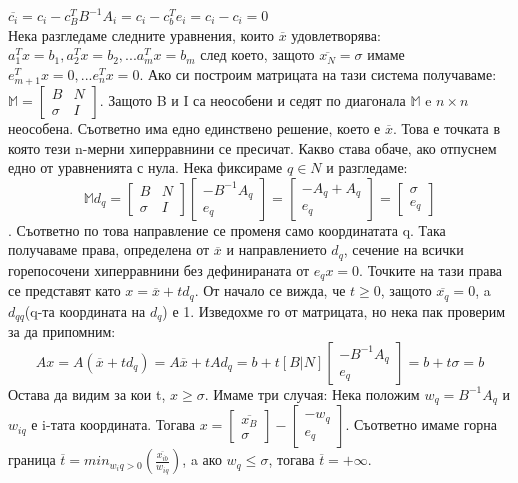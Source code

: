 \documentclass[12pt, a4paper]{article}
\def\D{\mathbb}
\begin{document}
$\overline{c_i} = c_i-c_B^TB^{-1}A_i=c_i-c_b^Te_i=c_i-c_i=0$\\
Нека разгледаме следните уравнения, които $\overline{x}$ удовлетворява: $a_1^Tx=b_1, a_2^Tx=b_2,...a_m^Tx=b_m$ след което, защото $\overline{x_N}=\sigma$ имаме $e_{m+1}^Tx=0,... e_n^Tx=0$. Ако си построим матрицата на тази система получаваме: $\D{M}=\left[\begin{array}{c|c}B & N \\ \hline \sigma & I \end{array}\right]$. Защото B и I са неособени и седят по диагонала $\D{M}$ e $n\times n$ неособена. Съответно има едно единствено решение, което е $\overline{x}$. Това е точката в която тези n-мерни хиперравнини се пресичат. Какво става обаче, ако отпуснем едно от уравненията с нула. Нека фиксираме $q\in N$ и разгледаме: 
\[\D{M}d_q = \left[\begin{array}{c|c}B & N \\ \hline \sigma & I \end{array}\right]\begin{bmatrix}-B^{-1}A_q\\ e_q\end{bmatrix}=\begin{bmatrix}-A_q+A_q\\ e_q\end{bmatrix}=\begin{bmatrix}\sigma\\ e_q\end{bmatrix}\].
Съответно по това направление се променя само координатата q. Така получаваме права, определена от $\overline{x}$ и направлението $d_q$, сечение на всички горепосочени хиперравнини без дефинираната от $e_qx=0$. Точките на тази права се представят като $x = \overline{x} + td_q$. От начало се вижда, че $t \geq 0 $, защото $\overline{x_q}=0$, a $d_{qq}$(q-та координата на $d_q$) е 1. Изведохме го от матрицата, но нека пак проверим за да припомним:
\[Ax = A(\overline{x}+td_q) = A\overline{x} + tAd_q = b+t[B|N]\begin{bmatrix}-B^{-1}A_q\\ e_q\end{bmatrix} = b+t\sigma=b\]
Остава да видим за кои t, $x\geq\sigma$. Имаме три случая:
Нека положим $w_q=B^{-1}A_q$ и $w_{iq}$ е i-тата координата. Тогава $x = \begin{bmatrix}\overline{x_B}\\ \sigma\end{bmatrix}-\begin{bmatrix}-w_q\\ e_q\end{bmatrix}$. Съответно имаме горна граница $\overline{t} = min_{w_iq>0}(\frac{\overline{x_{ib}}}{w_{iq}})$, a ако $w_q\leq\sigma$, тогава $\overline{t}=+\infty$.
\end{document}
